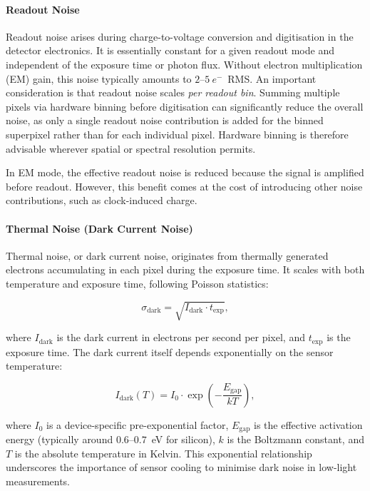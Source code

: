 \documentclass[
	parskip=half,
	a4paper,
]{scrarticle}
\begin{document}
\paragraph{Readout Noise}

Readout noise arises during charge-to-voltage conversion and digitisation in the detector electronics. It is essentially constant for a given readout mode and independent of the exposure time or photon flux. Without electron multiplication (EM) gain, this noise typically amounts to $2$--$5~e^{-}$~RMS. An important consideration is that readout noise scales \emph{per readout bin}. Summing multiple pixels via hardware binning before digitisation can significantly reduce the overall noise, as only a single readout noise contribution is added for the binned superpixel rather than for each individual pixel. Hardware binning is therefore advisable wherever spatial or spectral resolution permits.

In EM mode, the effective readout noise is reduced because the signal is amplified before readout. However, this benefit comes at the cost of introducing other noise contributions, such as clock-induced charge.

\paragraph{Thermal Noise (Dark Current Noise)}

Thermal noise, or dark current noise, originates from thermally generated electrons accumulating in each pixel during the exposure time. It scales with both temperature and exposure time, following Poisson statistics:

\begin{equation}
    \sigma_{\text{dark}} = \sqrt{I_{\text{dark}} \cdot t_{\text{exp}}},
\end{equation}

where $I_{\text{dark}}$ is the dark current in electrons per second per pixel, and $t_{\text{exp}}$ is the exposure time. The dark current itself depends exponentially on the sensor temperature:

\begin{equation}
    I_{\text{dark}}(T) = I_0 \cdot \exp\left(-\frac{E_{\text{gap}}}{k T}\right),
\end{equation}

where $I_0$ is a device-specific pre-exponential factor, $E_{\text{gap}}$ is the effective activation energy (typically around $0.6$--$0.7$~eV for silicon), $k$ is the Boltzmann constant, and $T$ is the absolute temperature in Kelvin. This exponential relationship underscores the importance of sensor cooling to minimise dark noise in low-light measurements.
\end{document}
